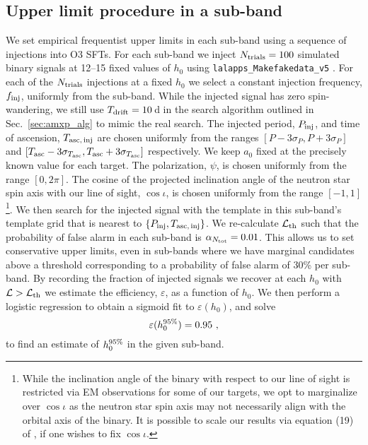 \subsection{Upper limit procedure in a sub-band \label{sec:amxp_ul_method}}
We set empirical frequentist upper limits in each sub-band using a sequence of injections into O3 SFTs. For each sub-band we inject $N_{\rm trials}=100$ simulated binary signals at 12--15 fixed values of $h_0$ using \texttt{lalapps\_Makefakedata\_v5} \cite{LAL2018}. For each of the $N_{\rm trials}$ injections at a fixed $h_0$ we select a constant injection frequency, $f_{\rm inj}$, uniformly from the sub-band. While the injected signal has zero spin-wandering, we still use $T_{\textrm{drift}}=10\,$d in the search algorithm outlined in Sec.~\ref{sec:amxp_alg} to mimic the real search. The injected period, $P_{\rm inj}$, and time of ascension, $T_{\rm asc,\,inj}$ are chosen uniformly from the ranges $[P - 3\sigma_P, P + 3\sigma_P]$ and $[T_{\textrm{asc}} - 3\sigma_{T_{\textrm{asc}}}, T_{\textrm{asc}} + 3\sigma_{T_{\textrm{asc}}}]$ respectively. We keep $a_0$ fixed at the precisely known value for each target. The polarization, $\psi$, is chosen uniformly from the range $[0, 2\pi]$. The cosine of the projected inclination angle of the neutron star spin axis with our line of sight, $\cos\iota$, is chosen uniformly from the range $[-1, 1]$\footnote{While the inclination angle of the binary with respect to our line of sight is restricted via EM observations for some of our targets, we opt to marginalize over $\cos\iota$ as the neutron star spin axis may not necessarily align with the orbital axis of the binary. It is possible to scale our results via equation (19) of \citet{Messenger2015a}, if one wishes to fix $\cos\iota$.}. We then search for the injected signal with the template in this sub-band's template grid that is nearest to $\{P_{\rm inj}, T_{\rm asc,\,inj}\}$. We re-calculate $\mathcal{L}_{\rm th}$ such that the probability of false alarm in each sub-band is $\alpha_{N_{\rm tot}} = 0.01$. This allows us to set conservative upper limits, even in sub-bands where we have marginal candidates above a threshold corresponding to a probability of false alarm of 30\% per sub-band. By recording the fraction of injected signals we recover at each $h_0$ with $\mathcal{L} > \mathcal{L}_{\rm th}$ we estimate the efficiency, $\varepsilon$, as a function of $h_0$. We then perform a logistic regression \cite{Gelman2013} to obtain a sigmoid fit to $\varepsilon(h_0)$, and solve 
\begin{equation}
\varepsilon(h_0^{95\%}) = 0.95\ , \label{eq:amxp_effic_95}
\end{equation}
to find an estimate of $h_0^{95\%}$ in the given sub-band. 

